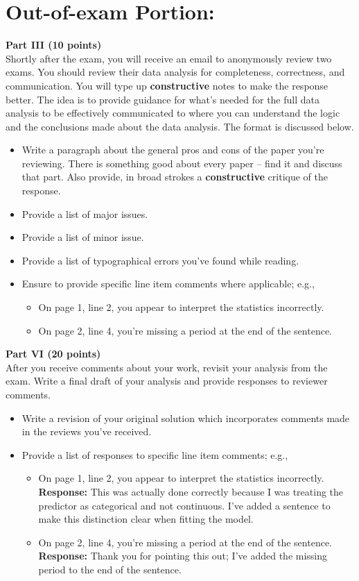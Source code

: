 \documentclass{article}
\begin{document}
\section{Out-of-exam Portion:}
\noindent \textbf{Part III (10 points)}\\
Shortly after the exam, you will receive an email to anonymously review two exams.
You should review their data analysis for completeness, correctness, and 
communication. You will type up \textbf{constructive} notes to make the response better. 
The idea is to provide guidance for what's needed for the full data analysis to be effectively 
communicated to where you can understand the logic and the conclusions made about the data analysis.
The format is discussed below.
\begin{itemize}
  \item Write a paragraph about the general pros and cons of the paper you're reviewing. There 
  is something good about every paper -- find it and discuss that part. Also provide, in broad strokes a 
  \textbf{constructive} critique of the response. 
  \item Provide a list of major issues.
  \item Provide a list of minor issue.
  \item Provide a list of typographical errors you've found while reading.
  \item Ensure to provide specific line item comments where applicable; e.g., 
  \begin{itemize}
    \item On page 1, line 2, you appear to interpret the statistics incorrectly.
    \item On page 2, line 4, you're missing a period at the end of the sentence.
  \end{itemize}
\end{itemize}

\noindent \textbf{Part VI (20 points)}\\
After you receive comments about your work, revisit your analysis from the exam. 
Write a final draft of your analysis and provide responses to reviewer comments.
\begin{itemize}
  \item Write a revision of your original solution which incorporates comments made
  in the reviews you've received.
  \item Provide a list of responses to specific line item comments; e.g.,
  \begin{itemize}
    \item On page 1, line 2, you appear to interpret the statistics incorrectly.\\
        \textbf{Response:} This was actually done correctly because I was treating 
        the predictor as categorical and not continuous. I've added a sentence to
        make this distinction clear when fitting the model.
    \item On page 2, line 4, you're missing a period at the end of the sentence.\\
        \textbf{Response:} Thank you for pointing this out; I've added the missing
        period to the end of the sentence.
  \end{itemize}
\end{itemize}
\end{document}
